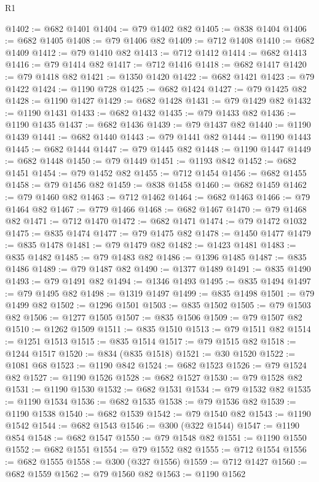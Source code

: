 \begin{lexlean}{R1}
\begin{coremodule}
{{{{{{{{{{{{{{{{{{{{{{{{{{{{{{{{{{{{{{{{{{{{{{{{{{@1402 := @682 @1401
@1404 := @79 @1402 @82
@1405 := @838 @1404
@1406 := @682 @1405
@1408 := @79 @1406 @82
@1409 := @712 @1408
@1410 := @682 @1409
@1412 := @79 @1410 @82
@1413 := @712 @1412
@1414 := @682 @1413
@1416 := @79 @1414 @82
@1417 := @712 @1416
@1418 := @682 @1417
@1420 := @79 @1418 @82
@1421 := @1350 @1420
@1422 := @682 @1421
@1423 := @79 @1422
@1424 := @1190 @728
@1425 := @682 @1424
@1427 := @79 @1425 @82
@1428 := @1190 @1427
@1429 := @682 @1428
@1431 := @79 @1429 @82
@1432 := @1190 @1431
@1433 := @682 @1432
@1435 := @79 @1433 @82
@1436 := @1190 @1435
@1437 := @682 @1436
@1439 := @79 @1437 @82
@1440 := @1190 @1439
@1441 := @682 @1440
@1443 := @79 @1441 @82
@1444 := @1190 @1443
@1445 := @682 @1444
@1447 := @79 @1445 @82
@1448 := @1190 @1447
@1449 := @682 @1448
@1450 := @79 @1449
@1451 := @1193 @842
@1452 := @682 @1451
@1454 := @79 @1452 @82
@1455 := @712 @1454
@1456 := @682 @1455
@1458 := @79 @1456 @82
@1459 := @838 @1458
@1460 := @682 @1459
@1462 := @79 @1460 @82
@1463 := @712 @1462
@1464 := @682 @1463
@1466 := @79 @1464 @82
@1467 := @779 @1466
@1468 := @682 @1467
@1470 := @79 @1468 @82
@1471 := @712 @1470
@1472 := @682 @1471
@1474 := @79 @1472 @1032
@1475 := @835 @1474
@1477 := @79 @1475 @82
@1478 := @1450 @1477
@1479 := @835 @1478
@1481 := @79 @1479 @82
@1482 := @1423 @1481
@1483 := @835 @1482
@1485 := @79 @1483 @82
@1486 := @1396 @1485
@1487 := @835 @1486
@1489 := @79 @1487 @82
@1490 := @1377 @1489
@1491 := @835 @1490
@1493 := @79 @1491 @82
@1494 := @1346 @1493
@1495 := @835 @1494
@1497 := @79 @1495 @82
@1498 := @1319 @1497
@1499 := @835 @1498
@1501 := @79 @1499 @82
@1502 := @1296 @1501
@1503 := @835 @1502
@1505 := @79 @1503 @82
@1506 := @1277 @1505
@1507 := @835 @1506
@1509 := @79 @1507 @82
@1510 := @1262 @1509
@1511 := @835 @1510
@1513 := @79 @1511 @82
@1514 := @1251 @1513
@1515 := @835 @1514
@1517 := @79 @1515 @82
@1518 := @1244 @1517
@1520 := @834 (@835 @1518)
@1521 := @30 @1520
@1522 := @1081 @68
@1523 := @1190 @842
@1524 := @682 @1523
@1526 := @79 @1524 @82
@1527 := @1190 @1526
@1528 := @682 @1527
@1530 := @79 @1528 @82
@1531 := @1190 @1530
@1532 := @682 @1531
@1534 := @79 @1532 @82
@1535 := @1190 @1534
@1536 := @682 @1535
@1538 := @79 @1536 @82
@1539 := @1190 @1538
@1540 := @682 @1539
@1542 := @79 @1540 @82
@1543 := @1190 @1542
@1544 := @682 @1543
@1546 := @300 (@322 @1544)
@1547 := @1190 @854
@1548 := @682 @1547
@1550 := @79 @1548 @82
@1551 := @1190 @1550
@1552 := @682 @1551
@1554 := @79 @1552 @82
@1555 := @712 @1554
@1556 := @682 @1555
@1558 := @300 (@327 @1556)
@1559 := @712 @1427
@1560 := @682 @1559
@1562 := @79 @1560 @82
@1563 := @1190 @1562
}}}}}}}}}}}}}}}}}}}}}}}}}}}}}}}}}}}}}}}}}}}}}}}}}}
\end{coremodule}
\end{lexlean}
